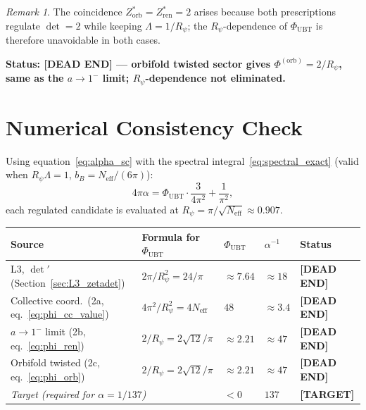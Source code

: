 \documentclass[11pt,a4paper]{article}
\theoremstyle{definition}
\theoremstyle{remark}
\newtheorem{remark}{Remark}
\begin{document}
\begin{remark}
  The coincidence $Z^*_{\mathrm{orb}} = Z^*_{\mathrm{ren}} = 2$ arises
  because both prescriptions regulate $\det = 2$ while keeping
  $\Lambda = 1/R_\psi$; the $R_\psi$-dependence of
  $\Phi_{\mathrm{UBT}}$ is therefore unavoidable in both cases.
\end{remark}

\medskip
\textbf{Status: \textbf{[DEAD END]} ---
orbifold twisted sector gives $\Phi^{(\mathrm{orb})} = 2/R_\psi$,
same as the $a \to 1^-$ limit; $R_\psi$-dependence not eliminated.}

\section{Numerical Consistency Check}
\label{sec:numerical_consistency}

Using equation~\eqref{eq:alpha_sc} with the spectral
integral~\eqref{eq:spectral_exact} (valid when $R_\psi\Lambda = 1$,
$b_B = N_{\mathrm{eff}}/(6\pi)$):
\begin{equation}
  4\pi\alpha
  = \Phi_{\mathrm{UBT}}\cdot\frac{3}{4\pi^2}
    + \frac{1}{\pi^2},
  \label{eq:alpha_check}
\end{equation}
each regulated candidate is evaluated at $R_\psi = \pi/\sqrt{N_{\mathrm{eff}}}
\approx 0.907$.

\begin{center}
\begin{tabular}{lllll}
  \toprule
  Source & Formula for $\Phi_{\mathrm{UBT}}$
    & $\Phi_{\mathrm{UBT}}$ & $\alpha^{-1}$ & Status \\
  \midrule
  L3, $\det'$ (Section~\ref{sec:L3_zetadet})
    & $2\pi/R_\psi^2 = 24/\pi$
    & $\approx 7.64$
    & $\approx 18$
    & \textbf{[DEAD END]} \\[3pt]
  Collective coord.\ (2a, eq.~\eqref{eq:phi_cc_value})
    & $4\pi^2/R_\psi^2 = 4N_{\mathrm{eff}}$
    & $48$
    & $\approx 3.4$
    & \textbf{[DEAD END]} \\[3pt]
  $a\!\to\!1^-$ limit (2b, eq.~\eqref{eq:phi_ren})
    & $2/R_\psi = 2\sqrt{12}/\pi$
    & $\approx 2.21$
    & $\approx 47$
    & \textbf{[DEAD END]} \\[3pt]
  Orbifold twisted (2c, eq.~\eqref{eq:phi_orb})
    & $2/R_\psi = 2\sqrt{12}/\pi$
    & $\approx 2.21$
    & $\approx 47$
    & \textbf{[DEAD END]} \\
  \midrule
  \multicolumn{2}{l}{\emph{Target (required for $\alpha = 1/137$)}}
    & $< 0$  & $137$ & \textbf{[TARGET]} \\
  \bottomrule
\end{tabular}
\end{center}
\end{document}
